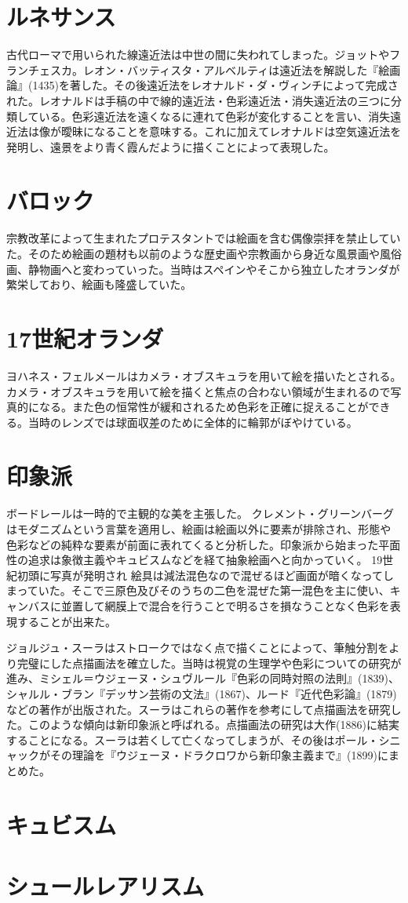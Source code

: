 
\section{ルネサンス}
	古代ローマで用いられた線遠近法は中世の間に失われてしまった。ジョットやフランチェスカ。レオン・バッティスタ・アルベルティは遠近法を解説した『絵画論』(1435)を著した。その後遠近法をレオナルド・ダ・ヴィンチによって完成された。レオナルドは手稿の中で線的遠近法・色彩遠近法・消失遠近法の三つに分類している。色彩遠近法を遠くなるに連れて色彩が変化することを言い、消失遠近法は像が曖昧になることを意味する。これに加えてレオナルドは空気遠近法を発明し、遠景をより青く霞んだように描くことによって表現した。
\section{バロック}
	宗教改革によって生まれたプロテスタントでは絵画を含む偶像崇拝を禁止していた。そのため絵画の題材も以前のような歴史画や宗教画から身近な風景画や風俗画、静物画へと変わっていった。当時はスペインやそこから独立したオランダが繁栄しており、絵画も隆盛していた。
\section{17世紀オランダ}
	ヨハネス・フェルメールはカメラ・オブスキュラを用いて絵を描いたとされる。カメラ・オブスキュラを用いて絵を描くと焦点の合わない領域が生まれるので写真的になる。また色の恒常性が緩和されるため色彩を正確に捉えることができる。当時のレンズでは球面収差のために全体的に輪郭がぼやけている。
\section{印象派}
	ボードレールは一時的で主観的な美を主張した。
	クレメント・グリーンバーグはモダニズムという言葉を適用し、絵画は絵画以外に要素が排除され、形態や色彩などの純粋な要素が前面に表れてくると分析した。印象派から始まった平面性の追求は象徴主義やキュビスムなどを経て抽象絵画へと向かっていく。
	19世紀初頭に写真が発明され
	絵具は減法混色なので混ぜるほど画面が暗くなってしまっていた。そこで三原色及びそのうちの二色を混ぜた第一混色を主に使い、キャンバスに並置して網膜上で混合を行うことで明るさを損なうことなく色彩を表現することが出来た。

	ジョルジュ・スーラはストロークではなく点で描くことによって、筆触分割をより完璧にした点描画法を確立した。当時は視覚の生理学や色彩についての研究が進み、ミシェル＝ウジェーヌ・シュヴルール『色彩の同時対照の法則』(1839)、シャルル・ブラン『デッサン芸術の文法』(1867)、ルード『近代色彩論』(1879)などの著作が出版された。スーラはこれらの著作を参考にして点描画法を研究した。このような傾向は新印象派と呼ばれる。点描画法の研究は大作(1886)に結実することになる。スーラは若くして亡くなってしまうが、その後はポール・シニャックがその理論を『ウジェーヌ・ドラクロワから新印象主義まで』(1899)にまとめた。
\section{キュビスム}
\section{シュールレアリスム}